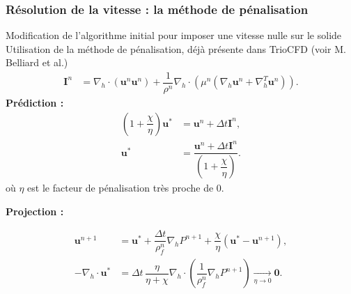 \documentclass{beamer}
\newcommand{\vect}[1]{\bm{#1}}
\newcommand{\npl}{{n+1}}
\renewcommand{\frac}{\dfrac}
\begin{document}
\begin{frame}
    \frametitle{Résolution de la vitesse : la méthode de pénalisation}
    \footnotesize
     \footnotesize
        \begin{ceablock}{Modification de l'algorithme initial pour imposer une vitesse nulle sur le solide}
	Utilisation de la méthode de pénalisation, déjà présente dans TrioCFD (voir M. Belliard et al.)
\begin{align}
	\vect{I}^n &= \nabla_h \cdot (\vect{u}^n \vect{u}^n) + \frac{1}{\rho^n} \nabla_h \cdot(\mu^n(\nabla_h \vect{u}^n+\nabla_h^T \vect{u}^n)).
\end{align}
	\textbf{Prédiction :}
\begin{align}
	(1+\frac{\chi}{\eta} ) \vect{u}^* &= \vect{u}^n + \Delta t \vect{I}^n, \label{eq:PDFpred1} \\ 
	\vect{u}^* &= \frac{\vect{u}^n + \Delta t \vect{I}^n}{(1+\frac{\chi}{\eta} )}. \label{eq:PDFpred2}
\end{align}
	où $\eta$ est le facteur de pénalisation très proche de $0$.
	

	\textbf{Projection :}

\begin{align}
	\vect{u}^{n+1} &= \vect{u}^* + \frac{\Delta t}{\rho^n_f} \nabla_h P^{n+1} +\frac{\chi}{\eta}(\vect{u}^*-\vect{u}^\npl),\\
-\nabla_h \cdot \vect{u}^* &= \Delta t \, \frac{\eta}{\eta + \chi} \nabla_h \cdot \left( \frac{1}{\rho^n_f} \nabla_h P^\npl \right) \underset{\eta \to 0}{\longrightarrow} \vect{0}.
%
\end{align}
	\end{ceablock}

\end{frame}
\end{document}

